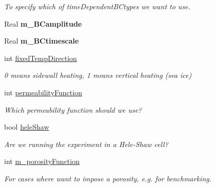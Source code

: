 \begin{DoxyCompactItemize}
\begin{DoxyCompactList}\small\item\em To specify which of time\-Dependent\-B\-Ctypes we want to use. \end{DoxyCompactList}\item 
\hypertarget{class_mushy_layer_params_aece8565e95c703995b0dc90bcc7066db}{Real {\bfseries m\-\_\-\-B\-Camplitude}}\label{class_mushy_layer_params_aece8565e95c703995b0dc90bcc7066db}

\item 
\hypertarget{class_mushy_layer_params_acd308081fbec823c35e80f63b10d0b22}{Real {\bfseries m\-\_\-\-B\-Ctimescale}}\label{class_mushy_layer_params_acd308081fbec823c35e80f63b10d0b22}

\item 
\hypertarget{class_mushy_layer_params_ad6f93ffb81ff66d7cf3a8f26c41e807f}{int \hyperlink{class_mushy_layer_params_ad6f93ffb81ff66d7cf3a8f26c41e807f}{fixed\-Temp\-Direction}}\label{class_mushy_layer_params_ad6f93ffb81ff66d7cf3a8f26c41e807f}

\begin{DoxyCompactList}\small\item\em 0 means sidewall heating, 1 means vertical heating (sea ice) \end{DoxyCompactList}\item 
\hypertarget{class_mushy_layer_params_a6598df14f2e4a82d67efeece6b2ad73f}{int \hyperlink{class_mushy_layer_params_a6598df14f2e4a82d67efeece6b2ad73f}{permeability\-Function}}\label{class_mushy_layer_params_a6598df14f2e4a82d67efeece6b2ad73f}

\begin{DoxyCompactList}\small\item\em Which permeability function should we use? \end{DoxyCompactList}\item 
\hypertarget{class_mushy_layer_params_a55a2f43bc312f950f53d4e05dca51b55}{bool \hyperlink{class_mushy_layer_params_a55a2f43bc312f950f53d4e05dca51b55}{hele\-Shaw}}\label{class_mushy_layer_params_a55a2f43bc312f950f53d4e05dca51b55}

\begin{DoxyCompactList}\small\item\em Are we running the experiment in a Hele-\/\-Shaw cell? \end{DoxyCompactList}\item 
\hypertarget{class_mushy_layer_params_aabdc87aa520120752a66ee502a5bd5be}{int \hyperlink{class_mushy_layer_params_aabdc87aa520120752a66ee502a5bd5be}{m\-\_\-porosity\-Function}}\label{class_mushy_layer_params_aabdc87aa520120752a66ee502a5bd5be}

\begin{DoxyCompactList}\small\item\em For cases where want to impose a porosity, e.\-g. for benchmarking. \end{DoxyCompactList}\end{DoxyCompactItemize}


